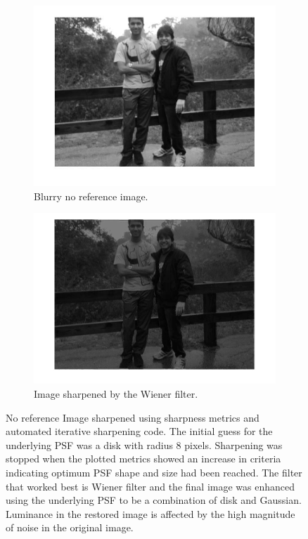 \begin{figure}[H]
        \centering
        \begin{subfigure}[b]{0.49\textwidth}
                \centering
                \includegraphics[width=\textwidth]{blur_personal.jpg}
                \caption{Blurry no reference image.}
        \end{subfigure}
        \begin{subfigure}[b]{0.49\textwidth}
                 \centering
                 \includegraphics[width=\textwidth]{sharp_personal_bright.jpg}
                 \caption{Image sharpened by the Wiener filter.}
                 \label{fig:friends}
                       
        \end{subfigure}
              
        \caption{No reference Image sharpened using sharpness metrics and automated iterative sharpening code. The initial guess for the underlying PSF was a disk with radius 8 pixels. Sharpening was stopped when the plotted metrics showed an increase in criteria indicating optimum PSF shape and size had been reached. The filter that worked best is Wiener filter and the final image was enhanced using the underlying PSF to be a combination of disk and Gaussian. Luminance in the restored image is affected by the high magnitude of noise in the original image.} \label{fig:true_metrics}
\end{figure}

\newpage
